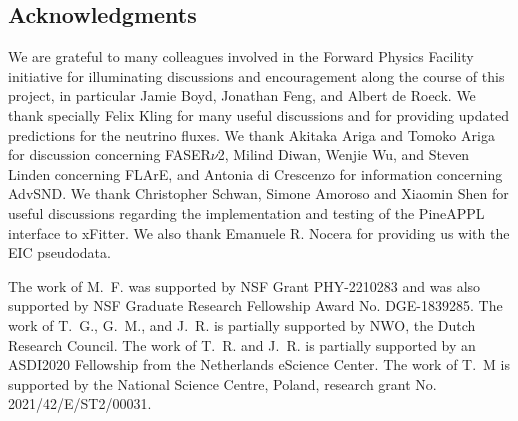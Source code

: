 \subsection*{Acknowledgments}
%
We are grateful to many colleagues involved in the Forward
Physics Facility initiative for illuminating
discussions and encouragement along the course of this project,
in particular Jamie Boyd, Jonathan Feng, and Albert de Roeck.
%
We thank specially Felix Kling for many useful discussions
and for providing updated predictions for the neutrino fluxes.
%
We thank Akitaka Ariga and Tomoko Ariga for discussion
concerning FASER$\nu$2, Milind Diwan,
Wenjie Wu, and Steven Linden concerning FLArE,
and Antonia di Crescenzo for information concerning AdvSND.
%
We thank Christopher Schwan, Simone Amoroso and Xiaomin Shen for useful 
discussions regarding the implementation and testing of the 
{\sc\small PineAPPL} interface to {\sc\small xFitter}.
%
We also thank Emanuele R. Nocera for providing us with the EIC pseudodata.

The work of M.~F. was supported by NSF Grant PHY-2210283 and was also supported by NSF Graduate Research Fellowship Award No. DGE-1839285.
%
The work of T.~G., G.~M., and J.~R. is partially supported by NWO, the Dutch Research Council.
%
The work of T.~R. and J.~R. is partially supported by an ASDI2020
Fellowship from the Netherlands eScience Center.
%
The work of T.~M is supported by the National Science Centre, Poland, research grant No. 2021/42/E/ST2/00031.
